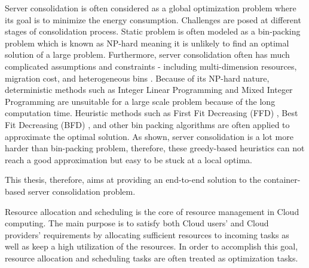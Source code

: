 Server consolidation is often considered as 
a global optimization problem where its goal is to minimize the energy consumption.
Challenges are posed at different stages of consolidation process. 
Static problem is often modeled as a bin-packing problem  \cite{Mann:2015ua} 
which is known as NP-hard meaning it is unlikely to find an optimal solution 
of a large problem. 
Furthermore, server consolidation often has 
much complicated assumptions and constraints - including multi-dimension resources, 
migration cost, and heterogeneous bins \cite{Mann:2015ua}.
Because of its NP-hard nature, deterministic methods such as 
Integer Linear Programming \cite{Speitkamp:2010vp} and Mixed
Integer Programming \cite{} are unsuitable for a large scale problem 
because of the long computation time. 
Heuristic methods such as First Fit Decreasing (FFD) \cite{Panigrahy:2011wk}, 
Best Fit Decreasing (BFD) \cite{Xu:2010vh}, 
and other bin packing algorithms are often applied to approximate the optimal solution.
As \cite{Mann:2015ua} shown, server consolidation is a lot more harder than bin-packing problem,
therefore, these greedy-based heuristics can not reach a good approximation but easy to 
be stuck at a local optima.


This thesis, therefore, aims at
providing an end-to-end solution to the container-based server consolidation problem.



Resource allocation and scheduling is the core of resource management in Cloud computing.
The main purpose is to satisfy both Cloud users' and Cloud providers' requirements by 
allocating sufficient resources to incoming tasks as well as keep a high utilization of the resources.
In order to accomplish this goal, 
resource allocation and scheduling tasks are often treated as optimization tasks.

